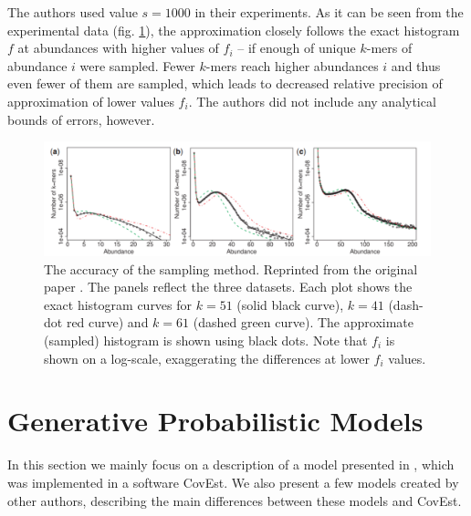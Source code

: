 The authors used value $s=1000$ in their experiments. As it can be seen from the experimental data (fig. \ref{img:kmergenie-sampling-accuracy}),
the approximation closely follows the exact histogram $f$ at abundances with higher values of $f_i$ -- if enough of unique $k$-mers of abundance 
$i$ were sampled. Fewer $k$-mers reach higher abundances $i$ and thus even fewer of them are sampled, which leads  
to decreased relative precision of approximation of lower values $f_i$. The authors did not include any analytical bounds of errors, however.

\begin{figure}
\centerline{\includegraphics[width=1.1\textwidth]{images/kmergenie-sampling-accuracy.pdf}}
\caption[Accuracy of KmerGenie Sampling]{The accuracy of the sampling method. Reprinted from the original paper \cite{Chikhi2013}. 
The panels reflect the three datasets. Each plot shows the exact
histogram curves for $k=51$ (solid black curve), $k=41$ (dash-dot red curve) and $k=61$ (dashed green curve). The approximate (sampled) histogram is
shown using black dots. Note that $f_i$ is shown on a log-scale, exaggerating the differences at lower $f_i$ values.}
\label{img:kmergenie-sampling-accuracy}
\end{figure}


\section{Generative Probabilistic Models}

In this section we mainly focus on a description of a model presented in \cite{Hozza2015, Hozza2016},
which was implemented in a software CovEst. We also present a few models created by other authors,
describing the main differences between these models and CovEst.
